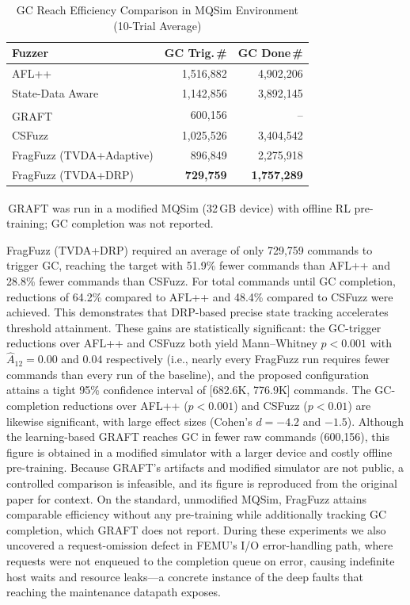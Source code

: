 \documentclass[conference]{IEEEtran}
\newcommand{\dg}{\textsuperscript{\dag}}
\begin{document}
\begin{table}[t]
\caption{GC Reach Efficiency Comparison in MQSim Environment (10-Trial Average)}
\label{tab:mqsim_efficiency}
\centering
\begin{tabularx}{\columnwidth}{@{}Xrr@{}}
\toprule
\textbf{Fuzzer} & \textbf{GC Trig.\,\#} & \textbf{GC Done\,\#} \\
\midrule
AFL++ & 1,516,882 & 4,902,206 \\
State-Data Aware & 1,142,856 & 3,892,145 \\
GRAFT\dg & 600,156 & -- \\
CSFuzz & 1,025,526 & 3,404,542 \\
\midrule
FragFuzz (TVDA+Adaptive) & 896,849 & 2,275,918 \\
FragFuzz (TVDA+DRP) & \textbf{729,759} & \textbf{1,757,289} \\
\bottomrule
\end{tabularx}

\vspace{2pt}
{\scriptsize\raggedright \dg\,GRAFT was run in a modified MQSim (32\,GB device) with offline RL pre-training; GC completion was not reported.\par}
\end{table}

FragFuzz (TVDA+DRP) required an average of only 729,759 commands to trigger GC, reaching the target with 51.9\% fewer commands than AFL++ and 28.8\% fewer commands than CSFuzz.
For total commands until GC completion, reductions of 64.2\% compared to AFL++ and 48.4\% compared to CSFuzz were achieved.
This demonstrates that DRP-based precise state tracking accelerates threshold attainment.
These gains are statistically significant: the GC-trigger reductions over AFL++ and CSFuzz both yield Mann--Whitney $p<0.001$ with $\hat{A}_{12}=0.00$ and $0.04$ respectively (i.e., nearly every FragFuzz run requires fewer commands than every run of the baseline), and the proposed configuration attains a tight 95\% confidence interval of [682.6K, 776.9K] commands.
The GC-completion reductions over AFL++ ($p<0.001$) and CSFuzz ($p<0.01$) are likewise significant, with large effect sizes (Cohen's $d=-4.2$ and $-1.5$).
Although the learning-based GRAFT reaches GC in fewer raw commands (600,156), this figure is obtained in a modified simulator with a larger device and costly offline pre-training.
Because GRAFT's artifacts and modified simulator are not public, a controlled comparison is infeasible, and its figure is reproduced from the original paper for context.
On the standard, unmodified MQSim, FragFuzz attains comparable efficiency without any pre-training while additionally tracking GC completion, which GRAFT does not report.
During these experiments we also uncovered a request-omission defect in FEMU's I/O error-handling path, where requests were not enqueued to the completion queue on error, causing indefinite host waits and resource leaks---a concrete instance of the deep faults that reaching the maintenance datapath exposes.
\end{document}
